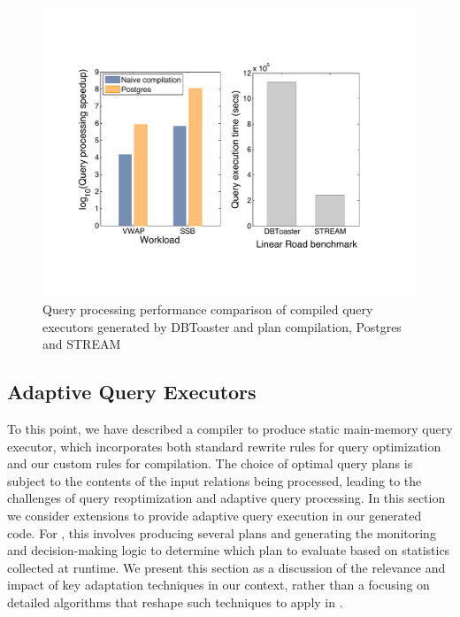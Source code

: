 \begin{figure}[htbp]
\begin{center}
\includegraphics[scale=0.4]{../plots/toaster_comparison.pdf}
\end{center}
\vspace{-4mm}
\caption{Query processing performance comparison of compiled query executors
generated by DBToaster and plan compilation, Postgres and STREAM}
\label{fig:dbtperf}
\end{figure}


\subsection{Adaptive Query Executors}

To this point, we have described a compiler to produce static main-memory query
executor, which incorporates both standard rewrite rules for query optimization
and our custom rules for compilation. The choice of optimal query plans is
subject to the contents of the input relations being processed, leading to the
challenges of query reoptimization and adaptive query processing. In this section
we consider extensions to provide adaptive query execution in our generated code.
For \compiler, this involves producing several plans and generating the
monitoring and decision-making logic to determine which plan to evaluate based on
statistics collected at runtime. We present this section as a discussion of the
relevance and impact of key adaptation techniques in our context, rather than a
focusing on detailed algorithms that reshape such techniques to apply in
\compiler.

